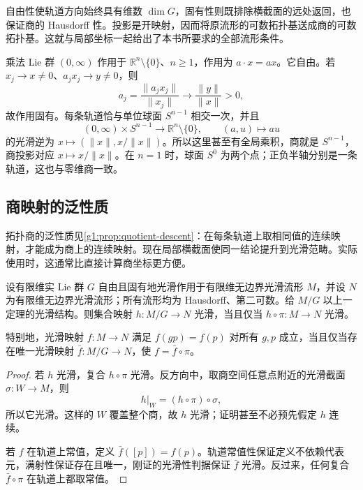 自由性使轨道方向始终具有维数 \(\dim G\)，固有性则既排除横截面的远处返回，也保证商的 Hausdorff 性。投影是开映射，因而将原流形的可数拓扑基送成商的可数拓扑基。这就与局部坐标一起给出了本书所要求的全部流形条件。

\begin{example}\label{g1:exm:positive-scaling-quotient}
	乘法 Lie 群 \((0,\infty)\) 作用于 \(\mathbb R^n\setminus\{0\}\)、\(n\ge1\)，作用为 \(a\cdot x=ax\)。它自由。若 \(x_j\to x\ne0\)、\(a_jx_j\to y\ne0\)，则
	\[
		a_j=\frac{\lVert a_jx_j\rVert}{\lVert x_j\rVert}
		\longrightarrow\frac{\lVert y\rVert}{\lVert x\rVert}>0,
	\]
	故作用固有。每条轨道恰与单位球面 \(S^{n-1}\) 相交一次，并且
	\[
		(0,\infty)\times S^{n-1}\longrightarrow\mathbb R^n\setminus\{0\},
		\qquad(a,u)\longmapsto au
	\]
	的光滑逆为 \(x\mapsto(\lVert x\rVert,x/\lVert x\rVert)\)。所以这里甚至有全局乘积，商就是 \(S^{n-1}\)，商投影对应 \(x\mapsto x/\lVert x\rVert\)。在 \(n=1\) 时，球面 \(S^0\) 为两个点；正负半轴分别是一条轨道，这也与零维商一致。
\end{example}

\subsection{商映射的泛性质}
\label{g1:subsec:1702:04}

拓扑商的泛性质见\cref{g1:prop:quotient-descent}：在每条轨道上取相同值的连续映射，才能成为商上的连续映射。现在局部横截面使同一结论提升到光滑范畴。实际使用时，这通常比直接计算商坐标更方便。

\begin{proposition}\label{g1:prop:quotient-smooth-universal-property}
	设有限维实 Lie 群 \(G\) 自由且固有地光滑作用于有限维无边界光滑流形 \(M\)，并设 \(N\) 为有限维无边界光滑流形；所有流形均为 Hausdorff、第二可数。给 \(M/G\) 以上一定理的光滑结构。则集合映射 \(h:M/G\to N\) 光滑，当且仅当 \(h\circ\pi:M\to N\) 光滑。

	特别地，光滑映射 \(f:M\to N\) 满足 \(f(gp)=f(p)\) 对所有 \(g,p\) 成立，当且仅当存在唯一光滑映射 \(\bar f:M/G\to N\)，使 \(f=\bar f\circ\pi\)。
\end{proposition}
\begin{proof}
	若 \(h\) 光滑，复合 \(h\circ\pi\) 光滑。反方向中，取商空间任意点附近的光滑截面 \(\sigma:W\to M\)，则
	\[
		h|_W=(h\circ\pi)\circ\sigma,
	\]
	所以它光滑。这样的 \(W\) 覆盖整个商，故 \(h\) 光滑；证明甚至不必预先假定 \(h\) 连续。

	若 \(f\) 在轨道上常值，定义 \(\bar f([p])=f(p)\)。轨道常值性保证定义不依赖代表元，满射性保证存在且唯一，刚证的光滑性判据保证 \(\bar f\) 光滑。反过来，任何复合 \(\bar f\circ\pi\) 在轨道上都取常值。
\end{proof}

